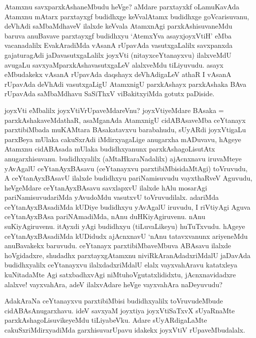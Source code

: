 \begin{artha}%
Atamxnu savxparxkAshaneMbudu heVge? aMdare parxtayxkf oLamuKavAda Atamxnu mAtarx parxtayxgf budidhxge keVvalAtamx budidhxge goVcarisuvanu, deVhAdi saMbaMdhaveV ilalxde keVvala AtamxnAgi parxkAshisuvaneMdu baruva anuBavave parxtayxgf budidhxyu `AtemxYva asayxjoyxVtiH' eMba vacanadalilx EvakAradiMda vAsanA rUpavAda vasutxgaLalilx savxpanxda gajaturagAdi jaDavasutxgaLalilx joyxVti (nitayxceYtanayxvu) ilalxveMdU avugaLu savxyaMparxkAshavasutxgaLeV alalxveMdu tiLiyuvudu. asayx eMbudakekx vAsanA rUpavAda daqshayx deVhAdigaLeV athaR I vAsanA rUpavAda deVhAdi vasutxgaLigU AtamxnigU parxkAshayx parxkAshaka BAva rUpavAda saMbaMdhavu SaSiThxV viBakitxyiMda gotutx paDiside.
\end{artha}

\begin{artha}
joyxVti eMbalilx joyxVtiVrUpaveMdareVnu? joyxVtiyeMdare BAsaka = parxkAshakaveMdathaR, asaMganAda AtamxnigU cidABAsaveMba ceYtanayx parxtibiMbada muKAMtara BAsakatavxvu barabahudu, sUyARdi joyxVtigaLu parxBeya mUlaka cakuSxrAdi iMdirxyagaLige anugarxha mADuvavu, hAgeye Atamxnu cidABAsada mUlaka budidhxyanunx parxkAshagoLisutAtx anugarxhisuvanu. budidhxyalilx (aMtaHkaraNadalilx) ajAcnxnavu iruvaMteye yAvAgalU ceYtanAyxBAsavu (ceYtanayxvu parxtibiMbisidaMtAgi) toVruvudu, A ceYtanAyxBAsavU ilalxde budidhxyu pariNamisuvudu vayxthaRveV Aguvudu, heVgeMdare ceYtanAyxBAsavu savxlapxvU ilalxde hAlu mosarAgi pariNamisuvudariMda yAvudoMdu vasutxvU toVruvudilalx. adariMda ceYtanAyxBAsadiMda kUDiye budidhxyu yAvAgalU iruvudu, I riVtiyAgi Aguva ceYtanAyxBAsa pariNAmadiMda, nAnu duHKiyAgiruvenu. nAnu suKiyAgiruvenu. itAyxdi yAgi budidhxyu (tiLuvaLikeyu) huTuTxvudu. hAgeye ceYtanAyxBAsadiMda kUDidudx ajAcnxnavU `nAnu tatavxvanunx ariyeneMdu anuBavakekx baruvudu. ceYtanayx parxtibiMbaveMbuva ABAsavu ilalxde hoVgidadxre, shudadhx parxtayxgAtamxnu niviRkAranAdadxriMdalU jaDavAda budidhxyalilx ceYtanayxvu ilalxdadxriMdalU elalx vayxvahAravu katatxleya kuNitadaMte Agi satxbadhxvAgi niMtuhoVgutatxlididxtu, jAcnxnavidadxre alalxve! vayxvahAra, adeV ilalxvAdare heVge vayxvahAra naDeyuvudu?
\end{artha}%

\begin{artha}
AdakAraNa ceYtanayxvu parxtibiMbisi budidhxyalilx toVruvudeMbude cidABAsAnugarxhavu. ideV savxyaM joyxtiya joyxVtiSaTxvX sUyaRnaMte parxkAshagoLisuvikeyeMdu tiLiyabeVku. Adare sUyARdigaLaMte cakuSxriMdirxyadiMda garxhisuvarUpavu idakekx joyxVtiV rUpaveMbudalalx. 
\end{artha}

